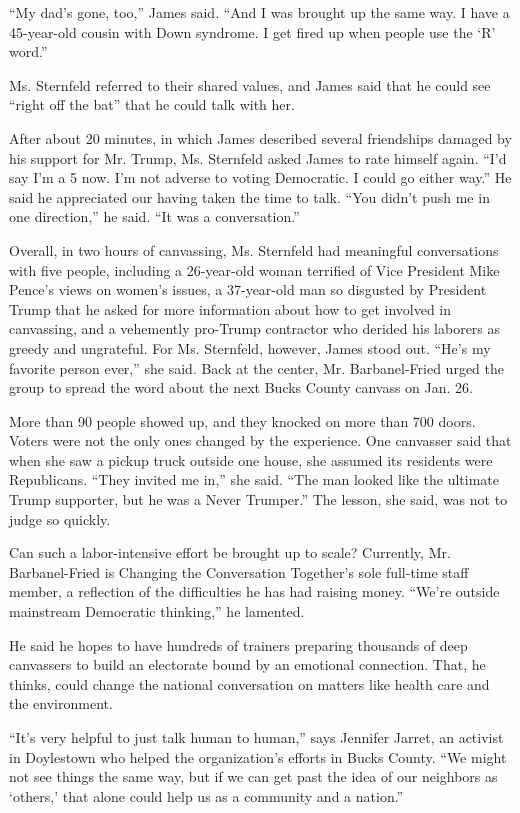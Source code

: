 ``My dad's gone, too,'' James said. ``And I was brought up the same way.
I have a 45-year-old cousin with Down syndrome. I get fired up when
people use the `R' word.''

Ms. Sternfeld referred to their shared values, and James said that he
could see ``right off the bat'' that he could talk with her.

After about 20 minutes, in which James described several friendships
damaged by his support for Mr. Trump, Ms. Sternfeld asked James to rate
himself again. ``I'd say I'm a 5 now. I'm not adverse to voting
Democratic. I could go either way.'' He said he appreciated our having
taken the time to talk. ``You didn't push me in one direction,'' he
said. ``It was a conversation.''

Overall, in two hours of canvassing, Ms. Sternfeld had meaningful
conversations with five people, including a 26-year-old woman terrified
of Vice President Mike Pence's views on women's issues, a 37-year-old
man so disgusted by President Trump that he asked for more information
about how to get involved in canvassing, and a vehemently pro-Trump
contractor who derided his laborers as greedy and ungrateful. For Ms.
Sternfeld, however, James stood out. ``He's my favorite person ever,''
she said. Back at the center, Mr. Barbanel-Fried urged the group to
spread the word about the next Bucks County canvass on Jan. 26.

More than 90 people showed up, and they knocked on more than 700 doors.
Voters were not the only ones changed by the experience. One canvasser
said that when she saw a pickup truck outside one house, she assumed its
residents were Republicans. ``They invited me in,'' she said. ``The man
looked like the ultimate Trump supporter, but he was a Never Trumper.''
The lesson, she said, was not to judge so quickly.

Can such a labor-intensive effort be brought up to scale? Currently, Mr.
Barbanel-Fried is Changing the Conversation Together's sole full-time
staff member, a reflection of the difficulties he has had raising money.
``We're outside mainstream Democratic thinking,'' he lamented.

He said he hopes to have hundreds of trainers preparing thousands of
deep canvassers to build an electorate bound by an emotional connection.
That, he thinks, could change the national conversation on matters like
health care and the environment.

``It's very helpful to just talk human to human,'' says Jennifer Jarret,
an activist in Doylestown who helped the organization's efforts in Bucks
County. ``We might not see things the same way, but if we can get past
the idea of our neighbors as `others,' that alone could help us as a
community and a nation.''

